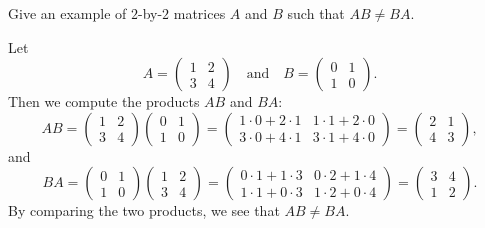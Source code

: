 \begin{exercise}
Give an example of $2$-by-$2$ matrices $A$ and $B$ such that $AB\ne BA$.
\end{exercise}
\begin{solution}
Let
\[ A = \begin{pmatrix} 1 & 2\\ 3 & 4 \end{pmatrix} \quad\text{and}\quad
   B = \begin{pmatrix} 0 & 1\\ 1 & 0 \end{pmatrix}. \]
Then we compute the products $AB$ and $BA$:
\[ AB = \begin{pmatrix} 1 & 2\\ 3 & 4 \end{pmatrix}
        \begin{pmatrix} 0 & 1\\ 1 & 0 \end{pmatrix}
      = \begin{pmatrix} 1\cdot0+2\cdot1 & 1\cdot1+2\cdot0\\
                        3\cdot0+4\cdot1 & 3\cdot1+4\cdot0 \end{pmatrix}
      = \begin{pmatrix} 2 & 1\\ 4 & 3 \end{pmatrix}, \]
and
\[ BA = \begin{pmatrix} 0 & 1\\ 1 & 0 \end{pmatrix}
        \begin{pmatrix} 1 & 2\\ 3 & 4 \end{pmatrix}
      = \begin{pmatrix} 0\cdot1+1\cdot3 & 0\cdot2+1\cdot4\\
                        1\cdot1+0\cdot3 & 1\cdot2+0\cdot4 \end{pmatrix}
      = \begin{pmatrix} 3 & 4\\ 1 & 2 \end{pmatrix}. \]
By comparing the two products, we see that $AB\ne BA$.
\end{solution}

